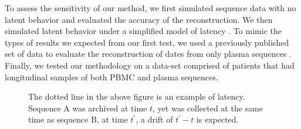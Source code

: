 To assess the sensitivity of our method, we first simulated sequence data with no latent behavior and evaluated the accuracy of the reconstruction. We then simulated latent behavior under a simplified model of latency \citep{Immonen14}. To mimic the types of results we expected from our first test, we used a previously published set of data to evaluate the reconstruction of dates from only plasma sequences \citep{McCloskey14}. Finally, we tested our methodology on a data-set comprised of patients that had longitudinal samples of both PBMC and plasma sequences.  

\begin{figure} \label{fig:latenttree}
	\centering
	\scalebox{5}{}
	\caption[Example of latent behavior]{The dotted line in the above figure is an example of latency. Sequence A was archived at time $t$, yet was collected at the same time as sequence B, at time $t^\prime$, a drift of $t^\prime - t$ is expected.}
\end{figure}

